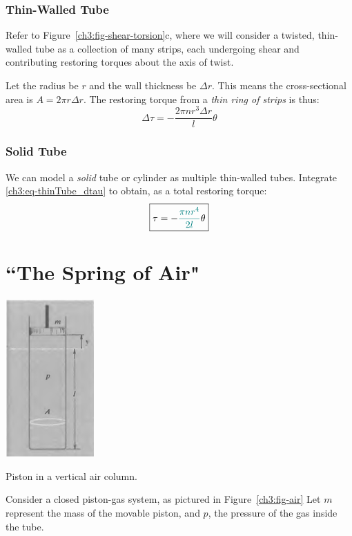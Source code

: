\subsubsection{Thin-Walled Tube}
Refer to Figure~\ref{ch3:fig-shear-torsion}c, where we will consider a twisted, thin-walled tube as a collection of many strips, each undergoing shear and contributing restoring torques about the axis of twist.

Let the radius be $r$ and the wall thickness be $\Delta r$. This means the cross-sectional area is $A=2\pi r \Delta r$. The restoring torque from a \emph{thin ring of strips} is thus:
\begin{equation}
\Delta \tau = -\frac{2\pi nr^3\Delta r}{l} \theta  \label{ch3:eq-thinTube_dtau}
\end{equation}

\subsubsection{Solid Tube}
We can model a \textit{solid} tube or cylinder as multiple thin-walled tubes. Integrate \eqref{ch3:eq-thinTube_dtau} to obtain, as a total restoring torque:
\begin{equation*}
	\boxed{\tau = -\textcolor{teal}{\frac{\pi nr^4}{2l}} \theta}
\end{equation*}

\section{``The Spring of Air"} \label{ch3:sec-air}

\begin{marginfigure}
	\centering
	\includegraphics[scale=0.8]{phys232/Ch3-air.png}
	\caption{Piston in a vertical air column.}
	\label{ch3:fig-air}
\end{marginfigure}

Consider a closed piston-gas system, as pictured in Figure~\ref{ch3:fig-air} Let $m$ represent the mass of the movable piston, and $p$, the pressure of the gas inside the tube.

